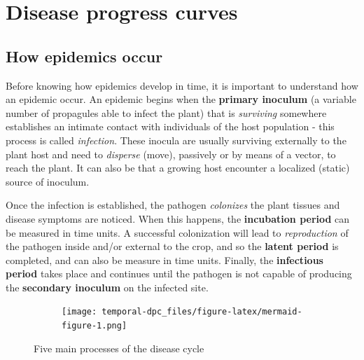 \documentclass[
  letterpaper,
]{book}
\begin{document}
\hypertarget{disease-progress-curves}{%
\chapter{Disease progress curves}\label{disease-progress-curves}}

\hypertarget{how-epidemics-occur}{%
\section{How epidemics occur}\label{how-epidemics-occur}}

Before knowing how epidemics develop in time, it is important to
understand how an epidemic occur. An epidemic begins when the
\textbf{primary inoculum} (a variable number of propagules able to
infect the plant) that is \emph{surviving} somewhere establishes an
intimate contact with individuals of the host population - this process
is called \emph{infection}. These inocula are usually surviving
externally to the plant host and need to \emph{disperse} (move),
passively or by means of a vector, to reach the plant. It can also be
that a growing host encounter a localized (static) source of inoculum.

Once the infection is established, the pathogen \emph{colonizes} the
plant tissues and disease symptoms are noticed. When this happens, the
\textbf{incubation period} can be measured in time units. A successful
colonization will lead to \emph{reproduction} of the pathogen inside
and/or external to the crop, and so the \textbf{latent period} is
completed, and can also be measure in time units. Finally, the
\textbf{infectious period} takes place and continues until the pathogen
is not capable of producing the \textbf{secondary inoculum} on the
infected site.

\begin{figure}

{\centering 

\begin{figure}[H]

{\centering \texttt{[image: temporal-dpc\_files/figure-latex/mermaid-figure-1.png]}

}

\end{figure}

}

\caption{\label{fig-diagram}Five main processes of the disease cycle}

\end{figure}
\end{document}
